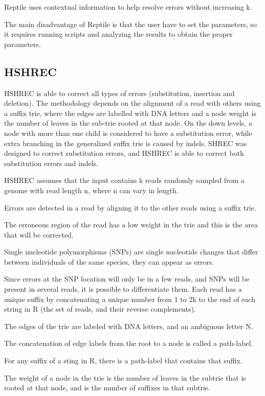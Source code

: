 \documentclass{llncs}
\begin{document}
Reptile uses contextual information to help resolve errors without increasing k.


The main disadvantage of Reptile is that the user have to set the parameters, so it
requires running scripts and analyzing the results to obtain the proper parameters.

\subsection{HSHREC}
HSHREC \cite{HShrec} is able to correct all types of errors (substitution, insertion and deletion). The methodology depends on the alignment of a read with others using a suffix trie, where the edges are labelled with DNA letters and a node weight is the number of leaves in the sub-trie rooted at that node. On the down levels, a node with more than one child is considered to have a substitution error, while extra branching in the generalized suffix trie is caused by indels.
SHREC was designed to correct substitution errors, and HSHREC is able to correct both substitution errors and indels.

HSHREC assumes that the input contains k reads randomly sampled from a genome with read length n, where n can vary in length. 

Errors are detected in a read by aligning it to the other reads using a suffix trie.

The erroneous region of the read has a low weight in the trie and this is the area that will be corrected.

Single nucleotide polymorphisms (SNPs) are single nucleotide changes that differ between individuals of the same species, they can appear as errors. 

Since errors at the SNP location will only be in a few reads, and SNPs will be present in several reads, it is possible to differentiate them.
Each read has a unique suffix by concatenating a unique number from 1 to 2k to the end of each string in R (the set of reads, and their reverse complements). 

The edges of the trie are labeled with DNA letters, and an ambiguous letter N.

The concatenation of edge labels from the root to a node is called a path-label. 

For any suffix of a sting in R, there is a path-label that contains that suffix. 

The weight of a node in the trie is the number of leaves in the subtrie that is rooted at that node, and is the number of suffixes in that subtrie. 
\end{document}
